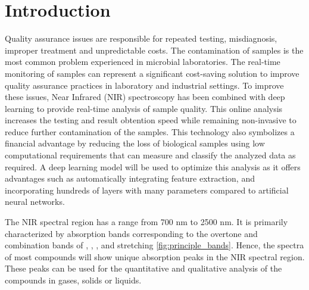 \documentclass[12pt]{report}
\renewcommand{\cite}{\supercite}
\begin{document}
\section{Introduction} %
Quality assurance issues are responsible for repeated testing, misdiagnosis, improper treatment and unpredictable costs.\cite{CostPoorQualityrandoxlaboratories} The contamination of samples is the most common problem experienced in microbial laboratories. The real-time monitoring of samples can represent a significant cost-saving solution to improve quality assurance practices in laboratory and industrial settings.\cite{ContaminationMicrobiologicalLaboratoryendeshawabatenh2018} To improve these issues, Near Infrared (NIR) spectroscopy has been combined with deep learning to provide real-time analysis of sample quality. This online analysis increases the testing and result obtention speed while remaining non-invasive to reduce further contamination of the samples.\cite{SpeechRecognitionUsingalsobhani2021} This technology also symbolizes a financial advantage by reducing the loss of biological samples using low computational requirements that can measure and classify the analyzed data as required. A deep learning model will be used to optimize this analysis as it offers advantages such as automatically integrating feature extraction, and incorporating hundreds of layers with many parameters compared to artificial neural networks.\cite{DeepLearningNearinfraredmishra2022}

The NIR spectral region has a range from 700 nm to 2500 nm.\cite{NearInfraredSpectroscopyOrganicweyer1985} It is primarily characterized by absorption bands corresponding to the overtone and combination bands of , , , and  stretching \autoref{fig:principle_bands}.\cite{UseInfraredSpectroscopyjohnson2023} Hence, the spectra of most compounds will show unique absorption peaks in the NIR spectral region. These peaks can be used for the quantitative and qualitative analysis of the compounds in gases, solids or liquids.
\end{document}
